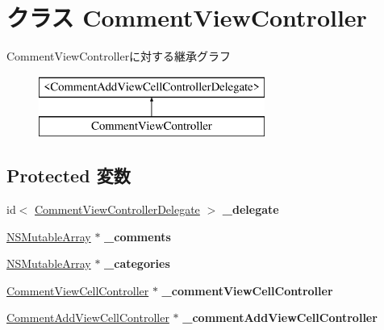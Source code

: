 \hypertarget{interface_comment_view_controller}{
\section{クラス CommentViewController}
\label{interface_comment_view_controller}
}
CommentViewControllerに対する継承グラフ\begin{figure}[H]
\begin{center}
\leavevmode
\includegraphics[height=2.000000cm]{interface_comment_view_controller}
\end{center}
\end{figure}
\subsection*{Protected 変数}
\begin{DoxyCompactItemize}
\item 
\hypertarget{interface_comment_view_controller_a15a1833571f37c048e5036412e1c266b}{
id$<$ \hyperlink{protocol_comment_view_controller_delegate-p}{CommentViewControllerDelegate} $>$ {\bfseries \_\-delegate}}
\label{interface_comment_view_controller_a15a1833571f37c048e5036412e1c266b}

\item 
\hypertarget{interface_comment_view_controller_a089c48a1b038414e6a3e026a66d89ff9}{
\hyperlink{class_n_s_mutable_array}{NSMutableArray} $\ast$ {\bfseries \_\-comments}}
\label{interface_comment_view_controller_a089c48a1b038414e6a3e026a66d89ff9}

\item 
\hypertarget{interface_comment_view_controller_ae015de3f7d5621a850f5a5e98db340cf}{
\hyperlink{class_n_s_mutable_array}{NSMutableArray} $\ast$ {\bfseries \_\-categories}}
\label{interface_comment_view_controller_ae015de3f7d5621a850f5a5e98db340cf}

\item 
\hypertarget{interface_comment_view_controller_a780778134ccbb349f003768c124dc224}{
\hyperlink{interface_comment_view_cell_controller}{CommentViewCellController} $\ast$ {\bfseries \_\-commentViewCellController}}
\label{interface_comment_view_controller_a780778134ccbb349f003768c124dc224}

\item 
\hypertarget{interface_comment_view_controller_a5ebe1c00734de55572d5c6b65acd937d}{
\hyperlink{interface_comment_add_view_cell_controller}{CommentAddViewCellController} $\ast$ {\bfseries \_\-commentAddViewCellController}}
\label{interface_comment_view_controller_a5ebe1c00734de55572d5c6b65acd937d}

\end{DoxyCompactItemize}
